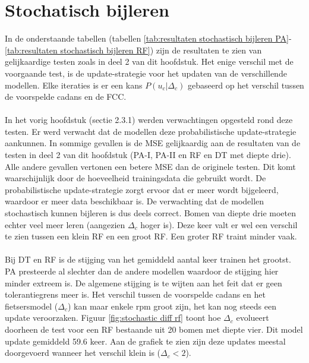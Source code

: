 \section{Stochatisch bijleren}
In de onderstaande tabellen (tabellen \ref{tab:resultaten stochastisch bijleren PA}-\ref{tab:resultaten stochastisch bijleren RF}) zijn de resultaten te zien van gelijkaardige testen zoals in deel 2 van dit hoofdstuk. Het enige verschil met de voorgaande test, is de update-strategie voor het updaten van de verschillende modellen. Elke iteraties is er een kans $P(u_c|\Delta_c)$ gebaseerd op het verschil tussen de voorspelde cadans en de FCC.
\\\\
In het vorig hoofdstuk (sectie 2.3.1) werden verwachtingen opgesteld rond deze testen. Er werd verwacht dat de modellen deze probabilistische update-strategie aankunnen. In sommige gevallen is de MSE gelijkaardig aan de resultaten van de testen in deel 2 van dit hoofdstuk (PA-I, PA-II en RF en DT met diepte drie). Alle andere gevallen vertonen een betere MSE dan de originele testen. Dit komt waarschijnlijk door de hoeveelheid trainingsdata die gebruikt wordt. De probabilistische update-strategie zorgt ervoor dat er meer wordt bijgeleerd, waardoor er meer data beschikbaar is. De verwachting dat de modellen stochastisch kunnen bijleren is dus deels correct. Bomen van diepte drie moeten echter veel meer leren (aangezien $\Delta_c$ hoger is). Deze keer valt er wel een verschil te zien tussen een klein RF en een groot RF. Een groter RF traint minder vaak.
\\\\
Bij DT en RF is de stijging van het gemiddeld aantal keer trainen het grootst. PA presteerde al slechter dan de andere modellen waardoor de stijging hier minder extreem is. De algemene stijging is te wijten aan het feit dat er geen tolerantiegrens meer is. Het verschil tussen de voorspelde cadans en het fietsersmodel ($\Delta_c$) kan maar enkele rpm groot zijn, het kan nog steeds een update veroorzaken. Figuur \ref{fig:stochastic diff rf} toont hoe $\Delta_c$ evolueert doorheen de test voor een RF bestaande uit 20 bomen met diepte vier. Dit model update gemiddeld 59.6 keer. Aan de grafiek te zien zijn deze updates meestal doorgevoerd wanneer het verschil klein is ($\Delta_c<2$).
 

